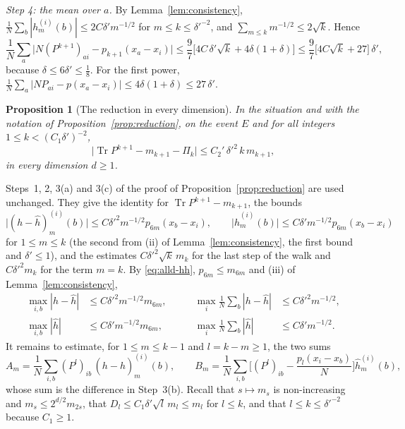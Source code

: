 \documentclass[11pt,a4paper]{article}
\makeatletter
\theoremstyle{stmt}
\newtheorem{proposition}[theorem]{Proposition}
\theoremstyle{defn}
\theoremstyle{rmk}
\renewenvironment{proof}[1][\proofname]{\par\pushQED{\qed}\normalfont\topsep6\p@\@plus6\p@\relax
  \trivlist\item[\hskip\labelsep{\sffamily\itshape\small #1.}]\ignorespaces}{\popQED\endtrivlist\@endpefalse}
\numberwithin{equation}{section}
\DeclareMathOperator{\Tr}{Tr}
\makeatother
\begin{document}
{\begin{proof}
\emph{Step 4: the mean over $a$.} By Lemma~\ref{lem:consistency},
$\frac1N\sum_b|h^{(i)}_m(b)|\le2C\delta'm^{-1/2}$ for $m\le k\le\delta'^{-2}$, and
$\sum_{m\le k}m^{-1/2}\le2\sqrt k$. Hence
\[
 \frac1N\sum_a\big|N(P^{k+1})_{ai}-p_{k+1}(x_a-x_i)\big|\le\frac97\Big[4C\,\delta'\sqrt k+4\delta(1+\delta)\Big]
 \le\frac97\big[4C\sqrt k+27\big]\,\delta' ,
\]
because $\delta\le6\delta'\le\frac18$. For the first power, $\frac1N\sum_a|NP_{ai}-p(x_a-x_i)|\le4\delta(1+\delta)\le27\,\delta'$.
\end{proof}

\begin{proposition}[The reduction in every dimension]\label{prop:reduction-alld}
In the situation and with the notation of Proposition~\ref{prop:reduction}, on the event $E$ and for all
integers $1\le k<(C_1\delta')^{-2}$,
\[
 \big|\Tr P^{k+1}-m_{k+1}-\Pi_k\big|\le C_2'\,\delta'^2\,k\,m_{k+1},
\]
in every dimension $d\ge1$.
\end{proposition}

\begin{proof}
Steps~1, 2, 3(a) and 3(c) of the proof of Proposition~\ref{prop:reduction} are used unchanged. They give
the identity for $\Tr P^{k+1}-m_{k+1}$, the bounds
\begin{equation}\label{eq:alld-hh}
 \big|(h-\hat h)^{(i)}_m(b)\big|\le C\delta'^2m^{-1/2}p_{6m}(x_b-x_i),\qquad
 \big|\hat h^{(i)}_m(b)\big|\le C\delta'm^{-1/2}p_{6m}(x_b-x_i)
\end{equation}
for $1\le m\le k$ (the second from (ii) of Lemma~\ref{lem:consistency}, the first bound and $\delta'\le1$),
and the estimates $C\delta'^2\sqrt k\,m_k$ for the last step of the walk and $C\delta'^2m_k$ for the term
$m=k$. By \eqref{eq:alld-hh}, $p_{6m}\le m_{6m}$ and (iii) of Lemma~\ref{lem:consistency},
\begin{equation}\label{eq:alld-norms}
\begin{aligned}
 \max_{i,b}|h-\hat h|&\le C\delta'^2m^{-1/2}m_{6m},&\qquad\max_i\frac1N\sum_b|h-\hat h|&\le C\delta'^2m^{-1/2},\\
 \max_{i,b}|\hat h|&\le C\delta'm^{-1/2}m_{6m},&\qquad\max_i\frac1N\sum_b|\hat h|&\le C\delta'm^{-1/2}.
\end{aligned}
\end{equation}
It remains to estimate, for $1\le m\le k-1$ and $l=k-m\ge1$, the two sums
\[
 A_m=\frac1N\sum_{i,b}(P^l)_{ib}\,(h-\hat h)^{(i)}_m(b),\qquad
 B_m=\frac1N\sum_{i,b}\Big[(P^l)_{ib}-\frac{p_l(x_i-x_b)}N\Big]\hat h^{(i)}_m(b),
\]
whose sum is the difference in Step~3(b). Recall that $s\mapsto m_s$ is non-increasing and
$m_s\le2^{d/2}m_{2s}$, that $D_l\le C_1\delta'\sqrt l\,m_l\le m_l$ for $l\le k$, and that $l\le k\le\delta'^{-2}$
because $C_1\ge1$.


\end{proof}}
\end{document}
